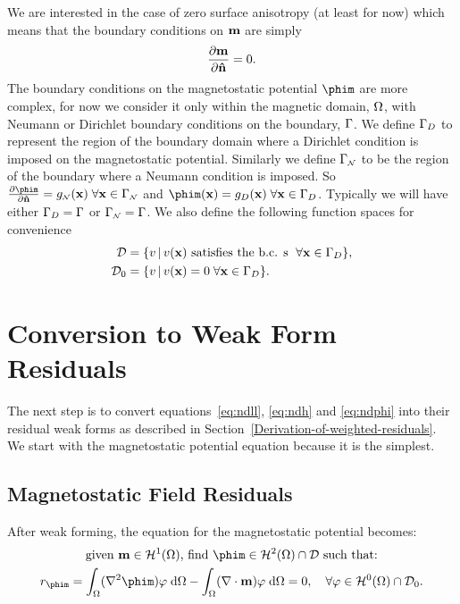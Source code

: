 We are interested in the case of zero surface anisotropy (at least for now) which means that the boundary conditions on $\mathbf{m}$ are simply\cite[pg. 178, 181]{Aharoni1996}
\begin{equation}
  \frac{\partial \mathbf{m}}{\partial \mathbf{\hat{n}}} = 0. \label{eqn:mbc}
\end{equation}
The boundary conditions on the magnetostatic potential $\phim$ are more complex, for now we consider it only within the magnetic domain, $\Omega$, with Neumann or Dirichlet boundary conditions on the boundary, ${\Gamma}$.
We define ${\Gamma}_D$ to represent the region of the boundary domain where a Dirichlet condition is imposed on the magnetostatic potential.
Similarly we define ${\Gamma}_{\scriptscriptstyle{\mathcal{N}}}$ to be the region of the boundary where a Neumann condition is imposed. So $ \ddn{\phim} = g_\Neu(\xv) \; \forall \xv \in \boundd_\Neu$ and $\phim(\xv) = g_D(\xv) \; \forall \xv \in \boundd_D$.
Typically we will have either ${\Gamma}_D = {\Gamma}$ or ${\Gamma}_{\scriptscriptstyle{\mathcal{N}}} = {\Gamma}$.
We also define the following function spaces for convenience
\begin{align}
  \label{eq:037}
  \mathcal{D} & = \{ v \,|\, v(\mathbf{x}) \text{ satisfies the b.c. s } \; \forall \mathbf{x} \in {\Gamma}_D \}, \\
  \mathcal{D}_0 &= \{ v \,|\, v(\mathbf{x}) = 0 \; \forall \mathbf{x} \in {\Gamma}_D \}.
\end{align}



\section{Conversion to Weak Form Residuals}

The next step is to convert equations~\eqref{eq:ndll}, \eqref{eq:ndh} and \eqref{eq:ndphi} into their residual weak forms as described in Section~\ref{Derivation-of-weighted-residuals}.
We start with the magnetostatic potential equation because it is the simplest.

\subsection{Magnetostatic Field Residuals}
\label{sec:magn-field-resid}

After weak forming, the equation for the magnetostatic potential becomes:
\begin{gather}
  \text{given $\mv \in \sob^1(\magd)$, find $\phim \in \sob^2(\magd) \cap \Dfs$ such that:} \notag \\
  r_{\phim} = \intd{(\lap \phim) \tbf}
  - \intd{(\nabla \cdot \mv) \tbf} = 0,
  \quad \forall \tbf \in \sob^0(\magd) \cap \Dfs_0. \label{eqn:phires1}
\end{gather}

